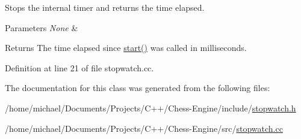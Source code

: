 Stops the internal timer and returns the time elapsed. 


\begin{DoxyParams}{Parameters}
{\em None} & \\
\hline
\end{DoxyParams}
\begin{DoxyReturn}{Returns}
The time elapsed since \mbox{\hyperlink{classStopwatch_aff8757dda8e913cc671eb3baeb662109}{start()}} was called in milliseconds. 
\end{DoxyReturn}


Definition at line 21 of file stopwatch.\+cc.



The documentation for this class was generated from the following files\+:\begin{DoxyCompactItemize}
\item 
/home/michael/\+Documents/\+Projects/\+C++/\+Chess-\/\+Engine/include/\mbox{\hyperlink{stopwatch_8h}{stopwatch.\+h}}\item 
/home/michael/\+Documents/\+Projects/\+C++/\+Chess-\/\+Engine/src/\mbox{\hyperlink{stopwatch_8cc}{stopwatch.\+cc}}\end{DoxyCompactItemize}

